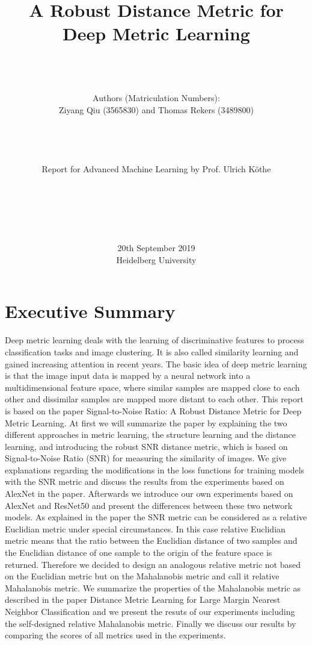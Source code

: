 \documentclass[12pt,paper=a4]{scrartcl}
\title{A Robust Distance Metric for Deep Metric Learning}
\author{\\ \\ \\Authors (Matriculation Numbers): \\
Ziyang Qiu (3565830) and Thomas Rekers (3489800) \\ \\ \\ \\ \\ Report for Advanced Machine Learning by Prof. Ulrich Köthe \\ \\ \\ \\ \\ \\}
\date{20th September 2019 \\ Heidelberg University}
\theoremstyle{break}
\begin{document}
\maketitle
\vfill
\thispagestyle{empty}
\cleardoublepage

\tableofcontents
\thispagestyle{empty}
\cleardoublepage

\setcounter{page}{1}
\section{Executive Summary}
Deep metric learning deals with the learning of discriminative features to process classification tasks and image clustering. It is also called similarity learning and gained increasing attention in recent years. The basic idea of deep metric learning is that the image input data is mapped by a neural network into a multidimensional feature space, where similar samples are mapped close to each other and dissimilar samples are mapped more distant to each other. This report is based on the paper \dq Signal-to-Noise Ratio: A Robust Distance Metric for Deep Metric Learning\dq \cite{source1}. At first we will summarize the paper by explaining the two different approaches in metric learning, the structure learning and the distance learning, and introducing the robust SNR distance metric, which is based on Signal-to-Noise Ratio (SNR) for measuring the similarity of images. We give explanations regarding the modifications in the loss functions for training models with the SNR metric and discuss the results from the experiments based on AlexNet in the paper. Afterwards we introduce our own experiments based on AlexNet and ResNet50 and present the differences between these two network models. As explained in the paper the SNR metric can be considered as a relative Euclidian metric under special circumstances. In this case relative Euclidian metric means that the ratio between the Euclidian distance of two samples and the Euclidian distance of one sample to the origin of the feature space is returned. Therefore we decided to design an analogous relative metric not based on the Euclidian metric but on the Mahalanobis metric and call it relative Mahalanobis metric. We summarize the properties of the Mahalanobis metric as described in the paper \dq Distance Metric Learning for Large Margin Nearest Neighbor Classification\dq\cite{weinberger} and we present the resuts of our experiments including the self-designed relative Mahalanobis metric. Finally we discuss our results by comparing the scores of all metrics used in the experiments.
\end{document}
